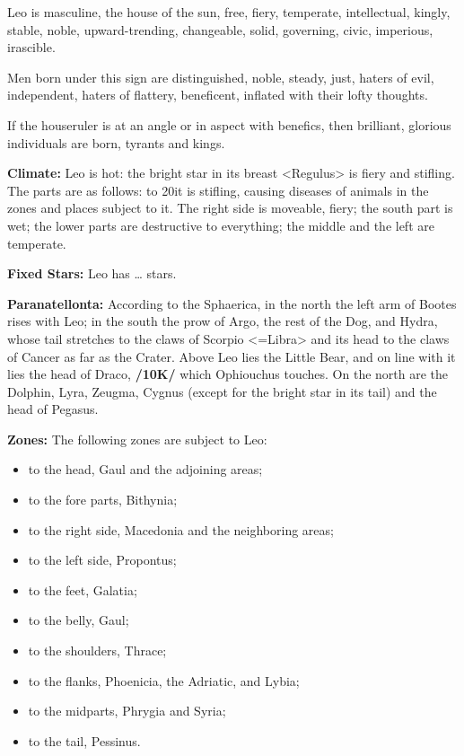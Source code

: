  Leo is masculine, the house of the sun, free,  fiery, temperate, intellectual, kingly, stable, noble, upward-trending, changeable,  solid, governing, civic, imperious, irascible.

Men born under this sign are distinguished, noble, steady, just, haters of evil, independent, haters of flattery, beneficent, inflated with their lofty thoughts. 

\mndl[0.2cm]
If the houseruler is at an angle or in aspect with benefics, then brilliant, glorious individuals are born, tyrants and kings.

\textbf{Climate:} Leo is hot: the bright star in its breast <Regulus> is fiery and stifling. The parts are as follows: to 20\deg it is stifling, causing diseases of animals in the zones and places subject to it. The right side is moveable,
fiery; the south part is wet; the lower parts are destructive to everything; the middle and the left are temperate.

\textbf{Fixed Stars:} Leo has … stars. 

\textbf{Paranatellonta:} According to the Sphaerica, in the north the left arm of Bootes rises with Leo; in the south the prow of Argo, the rest of the Dog, and Hydra, whose tail stretches to the claws of Scorpio <=Libra> and its head to the claws of Cancer as far as the Crater. Above Leo lies the Little Bear, and on line with it lies the head of Draco, \textbf{/10K/} which Ophiouchus touches. On the north are the Dolphin, Lyra, Zeugma, Cygnus (except for the bright star in its tail) and the head of Pegasus.

\textbf{Zones: } The following zones are subject to Leo: 
\begin{itemize}
\item to the head, Gaul and the adjoining areas; 
\item to the fore parts, Bithynia; 
\item to the right side, Macedonia and the neighboring areas; \item to the left side, Propontus; 
\item to the feet, Galatia; 
\item to the belly, Gaul; 
\item to the shoulders, Thrace; 
\item to the flanks, Phoenicia, the Adriatic, and Lybia; 
\item to the midparts, Phrygia and Syria; 
\item to the tail, Pessinus.
\end{itemize}

